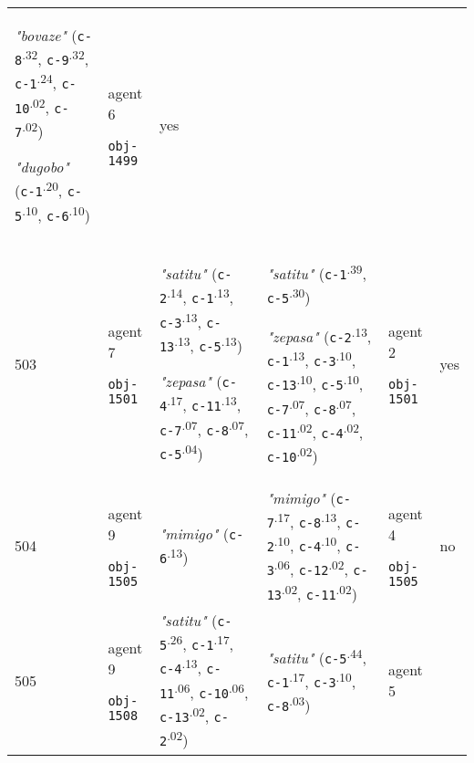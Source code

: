 {\begin{tabular}{p{0.4cm}p{1.4cm}p{7cm}p{7cm}p{1.4cm}p{0.6cm}}
\textit{"bovaze"} (\texttt{c-8}\textsuperscript{.32}, \texttt{c-9}\textsuperscript{.32}, \texttt{c-1}\textsuperscript{.24}, \texttt{c-10}\textsuperscript{.02}, \texttt{c-7}\textsuperscript{.02})

\textit{"dugobo"} (\texttt{c-1}\textsuperscript{.20}, \texttt{c-5}\textsuperscript{.10}, \texttt{c-6}\textsuperscript{.10}) & agent 6 

 \texttt{obj-1499} & yes \\
503 & agent 7 

\texttt{obj-1501} &\textit{"satitu"} (\texttt{c-2}\textsuperscript{.14}, \texttt{c-1}\textsuperscript{.13}, \texttt{c-3}\textsuperscript{.13}, \texttt{c-13}\textsuperscript{.13}, \texttt{c-5}\textsuperscript{.13})

\textit{"zepasa"} (\texttt{c-4}\textsuperscript{.17}, \texttt{c-11}\textsuperscript{.13}, \texttt{c-7}\textsuperscript{.07}, \texttt{c-8}\textsuperscript{.07}, \texttt{c-5}\textsuperscript{.04}) & \textit{"satitu"} (\texttt{c-1}\textsuperscript{.39}, \texttt{c-5}\textsuperscript{.30})

\textit{"zepasa"} (\texttt{c-2}\textsuperscript{.13}, \texttt{c-1}\textsuperscript{.13}, \texttt{c-3}\textsuperscript{.10}, \texttt{c-13}\textsuperscript{.10}, \texttt{c-5}\textsuperscript{.10}, \texttt{c-7}\textsuperscript{.07}, \texttt{c-8}\textsuperscript{.07}, \texttt{c-11}\textsuperscript{.02}, \texttt{c-4}\textsuperscript{.02}, \texttt{c-10}\textsuperscript{.02}) & agent 2 

 \texttt{obj-1501} & yes \\
504 & agent 9 

\texttt{obj-1505} &\textit{"mimigo"} (\texttt{c-6}\textsuperscript{.13}) & \textit{"mimigo"} (\texttt{c-7}\textsuperscript{.17}, \texttt{c-8}\textsuperscript{.13}, \texttt{c-2}\textsuperscript{.10}, \texttt{c-4}\textsuperscript{.10}, \texttt{c-3}\textsuperscript{.06}, \texttt{c-12}\textsuperscript{.02}, \texttt{c-13}\textsuperscript{.02}, \texttt{c-11}\textsuperscript{.02}) & agent 4 

 \texttt{obj-1505} & no \\
505 & agent 9 

\texttt{obj-1508} &\textit{"satitu"} (\texttt{c-5}\textsuperscript{.26}, \texttt{c-1}\textsuperscript{.17}, \texttt{c-4}\textsuperscript{.13}, \texttt{c-11}\textsuperscript{.06}, \texttt{c-10}\textsuperscript{.06}, \texttt{c-13}\textsuperscript{.02}, \texttt{c-2}\textsuperscript{.02}) & \textit{"satitu"} (\texttt{c-5}\textsuperscript{.44}, \texttt{c-1}\textsuperscript{.17}, \texttt{c-3}\textsuperscript{.10}, \texttt{c-8}\textsuperscript{.03}) & agent 5 


\end{tabular}}
